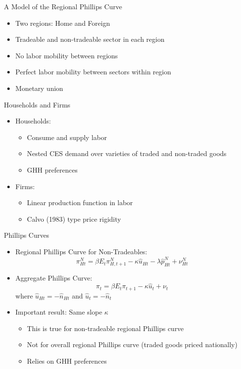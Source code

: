 \documentclass[10pt]{beamer}
\begin{document}
\begin{frame}{A Model of the Regional Phillips Curve}
	\begin{itemize}
		\itemsep1em 
		\item Two regions: Home and Foreign
		\item Tradeable and non-tradeable sector in each region
		\item No labor mobility between regions
		\item Perfect labor mobility between sectors within region
		\item Monetary union
	\end{itemize}
\end{frame}


\begin{frame}{Households and Firms}
	\begin{itemize}
		\itemsep1em
		\item Households:
		\begin{itemize}
			\item Consume and supply labor
			\item Nested CES demand over varieties of traded and non-traded goods
			\item GHH preferences 
		\end{itemize}
		\item Firms:
		\begin{itemize}
			\item Linear production function in labor 
			\item Calvo (1983) type price rigidity
		\end{itemize}
	\end{itemize}
\end{frame}


\begin{frame}{Phillips Curves}
	\begin{itemize}
		\itemsep1em 
		\item Regional Phillips Curve for Non-Tradeables:
		\[\pi^N_{Ht}=\beta E_{t}\pi^N_{H,t+1}-\kappa\hat{u}_{Ht} - \lambda \hat{p}^N_{Ht} + \nu^N_{Ht} \]
		\item Aggregate Phillips Curve:
		\[\pi_{t}=\beta E_{t} \pi_{t+1} - \kappa\hat{u}_{t} + {\nu}_{t} \]
		where $\hat{u}_{Ht} = - \hat{n}_{Ht}$ and $\hat{u}_t = - \hat{n}_t$ 
		\item Important result: Same slope $\kappa$
		\begin{itemize}
			\item This is true for non-tradeable regional Phillips curve
			\item Not for overall regional Phillips curve (traded goods priced nationally)
			\item Relies on GHH preferences
		\end{itemize}	
	\end{itemize}		
\end{frame}
\end{document}

